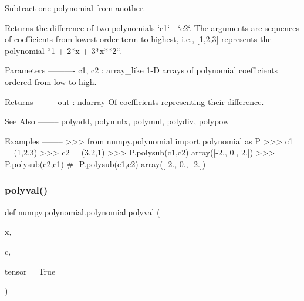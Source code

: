 \begin{DoxyVerb}Subtract one polynomial from another.

Returns the difference of two polynomials `c1` - `c2`.  The arguments
are sequences of coefficients from lowest order term to highest, i.e.,
[1,2,3] represents the polynomial ``1 + 2*x + 3*x**2``.

Parameters
----------
c1, c2 : array_like
    1-D arrays of polynomial coefficients ordered from low to
    high.

Returns
-------
out : ndarray
    Of coefficients representing their difference.

See Also
--------
polyadd, polymulx, polymul, polydiv, polypow

Examples
--------
>>> from numpy.polynomial import polynomial as P
>>> c1 = (1,2,3)
>>> c2 = (3,2,1)
>>> P.polysub(c1,c2)
array([-2.,  0.,  2.])
>>> P.polysub(c2,c1) # -P.polysub(c1,c2)
array([ 2.,  0., -2.])\end{DoxyVerb}
 \mbox{\label{namespacenumpy_1_1polynomial_1_1polynomial_adb505068305c9e8c1b0d5b0eac04fe32}} 
\subsubsection{\texorpdfstring{polyval()}{polyval()}}
{\footnotesize\ttfamily def numpy.\+polynomial.\+polynomial.\+polyval (\begin{DoxyParamCaption}\item[{}]{x,  }\item[{}]{c,  }\item[{}]{tensor = {\ttfamily True} }\end{DoxyParamCaption})}

